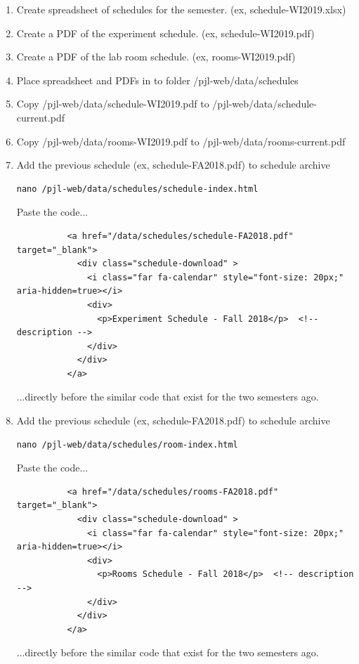 \documentclass[justified]{book}
\begin{document}
\begin{enumerate}

\item Create spreadsheet of schedules for the semester. (ex, schedule-WI2019.xlsx)

\item Create a PDF of the experiment schedule. (ex, schedule-WI2019.pdf)

\item Create a PDF of the lab room schedule. (ex, rooms-WI2019.pdf)

\item Place spreadsheet and PDFs in to folder /pjl-web/data/schedules

\item Copy /pjl-web/data/schedule-WI2019.pdf to /pjl-web/data/schedule-current.pdf

\item Copy /pjl-web/data/rooms-WI2019.pdf to /pjl-web/data/rooms-current.pdf

\item Add the previous schedule (ex, schedule-FA2018.pdf) to schedule archive

\begin{lstlisting}
nano /pjl-web/data/schedules/schedule-index.html       
\end{lstlisting}

Paste the code...
\begin{lstlisting}
          <a href="/data/schedules/schedule-FA2018.pdf" target="_blank">
            <div class="schedule-download" >
              <i class="far fa-calendar" style="font-size: 20px;" aria-hidden=true></i> 
              <div>
                <p>Experiment Schedule - Fall 2018</p>  <!-- description -->
              </div>
            </div>
          </a>
\end{lstlisting}

...directly before the similar code that exist for the two semesters ago.

\item Add the previous schedule (ex, schedule-FA2018.pdf) to schedule archive

\begin{lstlisting}
nano /pjl-web/data/schedules/room-index.html       
\end{lstlisting}

Paste the code...
\begin{lstlisting}
          <a href="/data/schedules/rooms-FA2018.pdf" target="_blank">
            <div class="schedule-download" >
              <i class="far fa-calendar" style="font-size: 20px;" aria-hidden=true></i> 
              <div>
                <p>Rooms Schedule - Fall 2018</p>  <!-- description -->
              </div>
            </div>
          </a>
\end{lstlisting}

...directly before the similar code that exist for the two semesters ago.

\end{enumerate}
\end{document}

